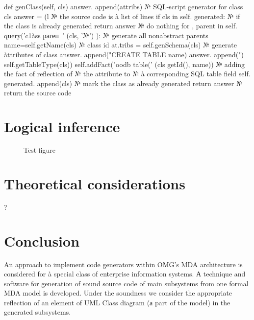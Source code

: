 \documentclass{intech}
\begin{document}
def genClass(self, cls)
answer. append(attribs)
№ SQL-script generator for class cls
answer = (l
№ the source code is à list of lines
if cls in self. generated:
№ if the class is already generated
return answer № do nothing
for , parent in
self. query('c1àss рагеп~'
(cls, '№') ):
№ generate all nonabstract parents
name=self.getName(cls) № class id
at.tribs = self.genSchema(cls)
№ generate àttributes of class
answer. append("CREATE TABLE %
name)
answer. append(")%
self.getTableType(cls))
self.addFact("oodb table('%
(cls getId(), name))
№ adding the fact of reflection of
№ the attribute to
№ à corresponding SQL table field
self. generated. append(cls)
№ mark the class as already generated
return answer № return the source code

\section{Logical inference}
\label{sec:log-inf}

\begin{figure}[htb]
  \centering

  \caption{Test figure}
  \label{fig:test-fig}
\end{figure}

\begin{table}[htb]
  \centering

  \caption{Test Table}
  \label{tab:test-tbl}
\end{table}

\section{Theoretical considerations}
\label{sec:theor-general}

?



\section{Conclusion}

An approach to implement code generators within OMG's MDA architecture is considered for à special class of enterprise information systems. А technique and software for generation of sound source code of main subsystems from one formal MDA model is developed. Under the soundness we consider the appropriate reflection of an element of UML Class diagram (а part of the model) in the generated subsystems.
\end{document}
